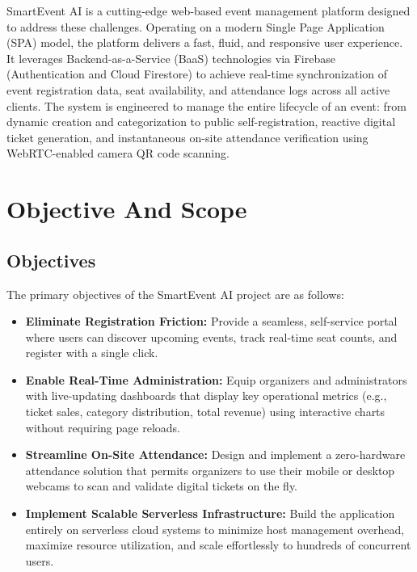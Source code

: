 \documentclass[14pt,a4paper]{extreport}
\begin{document}
SmartEvent AI is a cutting-edge web-based event management platform designed to address these challenges. Operating on a modern Single Page Application (SPA) model, the platform delivers a fast, fluid, and responsive user experience. It leverages Backend-as-a-Service (BaaS) technologies via Firebase (Authentication and Cloud Firestore) to achieve real-time synchronization of event registration data, seat availability, and attendance logs across all active clients. The system is engineered to manage the entire lifecycle of an event: from dynamic creation and categorization to public self-registration, reactive digital ticket generation, and instantaneous on-site attendance verification using WebRTC-enabled camera QR code scanning.

\section{Objective And Scope}
\subsection{Objectives}
The primary objectives of the SmartEvent AI project are as follows:
\begin{itemize}
    \item \textbf{Eliminate Registration Friction:} Provide a seamless, self-service portal where users can discover upcoming events, track real-time seat counts, and register with a single click.
    \item \textbf{Enable Real-Time Administration:} Equip organizers and administrators with live-updating dashboards that display key operational metrics (e.g., ticket sales, category distribution, total revenue) using interactive charts without requiring page reloads.
    \item \textbf{Streamline On-Site Attendance:} Design and implement a zero-hardware attendance solution that permits organizers to use their mobile or desktop webcams to scan and validate digital tickets on the fly.
    \item \textbf{Implement Scalable Serverless Infrastructure:} Build the application entirely on serverless cloud systems to minimize host management overhead, maximize resource utilization, and scale effortlessly to hundreds of concurrent users.
\end{itemize}
\end{document}
